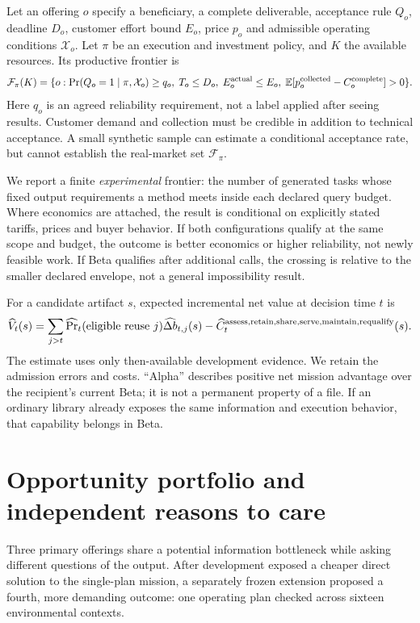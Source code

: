 \documentclass[11pt,letterpaper]{article}
\begin{document}
Let an offering $o$ specify a beneficiary, a complete deliverable, acceptance rule $Q_o$, deadline $D_o$, customer effort bound $E_o$, price $p_o$ and admissible operating conditions $\mathcal{X}_o$. Let $\pi$ be an execution and investment policy, and $K$ the available resources. Its productive frontier is
\[
\mathcal{F}_{\pi}(K)=\{o:\Pr(Q_o=1\mid\pi,\mathcal{X}_o)\geq q_o,\;
T_o\leq D_o,\;E_o^{\rm actual}\leq E_o,\;
\mathbb{E}[p_o^{\rm collected}-C_o^{\rm complete}]>0\}.
\]
Here $q_o$ is an agreed reliability requirement, not a label applied after seeing results. Customer demand and collection must be credible in addition to technical acceptance. A small synthetic sample can estimate a conditional acceptance rate, but cannot establish the real-market set $\mathcal{F}_{\pi}$.

We report a finite \emph{experimental} frontier: the number of generated tasks whose fixed output requirements a method meets inside each declared query budget. Where economics are attached, the result is conditional on explicitly stated tariffs, prices and buyer behavior. If both configurations qualify at the same scope and budget, the outcome is better economics or higher reliability, not newly feasible work. If Beta qualifies after additional calls, the crossing is relative to the smaller declared envelope, not a general impossibility result.

For a candidate artifact $s$, expected incremental net value at decision time $t$ is
\[
\widehat{V}_{t}(s)=\sum_{j>t}\widehat{\Pr}_{t}(\text{eligible reuse }j)
\widehat{\Delta b}_{t,j}(s)-\widehat{C}_{t}^{\rm assess,retain,share,serve,maintain,requalify}(s).
\]
The estimate uses only then-available development evidence. We retain the admission errors and costs. ``Alpha'' describes positive net mission advantage over the recipient's current Beta; it is not a permanent property of a file. If an ordinary library already exposes the same information and execution behavior, that capability belongs in Beta.

\section{Opportunity portfolio and independent reasons to care}

Three primary offerings share a potential information bottleneck while asking different questions of the output. After development exposed a cheaper direct solution to the single-plan mission, a separately frozen extension proposed a fourth, more demanding outcome: one operating plan checked across sixteen environmental contexts.
\end{document}
